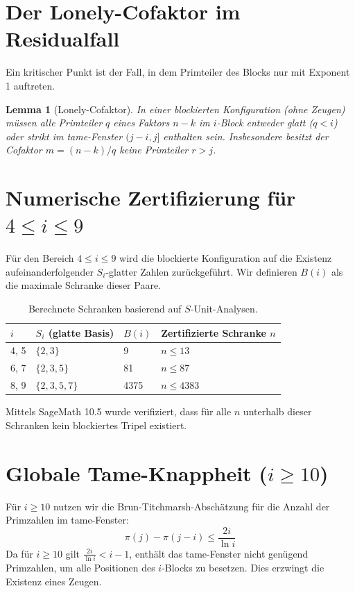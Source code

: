 \documentclass[12pt,a4paper]{article}
\newtheorem{lemma}[theorem]{Lemma}
\begin{document}
	\section{Der Lonely-Cofaktor im Residualfall}
	Ein kritischer Punkt ist der Fall, in dem Primteiler des Blocks nur mit Exponent 1 auftreten.
	
	\begin{lemma}[Lonely-Cofaktor]
		In einer blockierten Konfiguration (ohne Zeugen) müssen alle Primteiler $q$ eines Faktors $n-k$ im $i$-Block entweder glatt ($q < i$) oder strikt im tame-Fenster $(j-i, j]$ enthalten sein. Insbesondere besitzt der Cofaktor $m = (n-k)/q$ keine Primteiler $r > j$.
	\end{lemma}
	
	\section{Numerische Zertifizierung für $4 \le i \le 9$}
	Für den Bereich $4 \le i \le 9$ wird die blockierte Konfiguration auf die Existenz aufeinanderfolgender $S_i$-glatter Zahlen zurückgeführt. Wir definieren $B(i)$ als die maximale Schranke dieser Paare.
	
	\begin{table}[h]
		\centering
		\begin{tabular}{@{}llll@{}}
			\toprule
			$i$ & $S_i$ (glatte Basis) & $B(i)$ & Zertifizierte Schranke $n$ \\ \midrule
			4, 5 & $\{2, 3\}$ & 9 & $n \le 13$ \\
			6, 7 & $\{2, 3, 5\}$ & 81 & $n \le 87$ \\
			8, 9 & $\{2, 3, 5, 7\}$ & 4375 & $n \le 4383$ \\ \bottomrule
		\end{tabular}
		\caption{Berechnete Schranken basierend auf $S$-Unit-Analysen.}
	\end{table}
	
	Mittels SageMath 10.5 wurde verifiziert, dass für alle $n$ unterhalb dieser Schranken kein blockiertes Tripel existiert.
	
	\section{Globale Tame-Knappheit ($i \ge 10$)}
	Für $i \ge 10$ nutzen wir die Brun-Titchmarsh-Abschätzung für die Anzahl der Primzahlen im tame-Fenster:
	\begin{equation}
		\pi(j) - \pi(j-i) \le \frac{2i}{\ln i}
	\end{equation}
	Da für $i \ge 10$ gilt $\frac{2i}{\ln i} < i-1$, enthält das tame-Fenster nicht genügend Primzahlen, um alle Positionen des $i$-Blocks zu besetzen. Dies erzwingt die Existenz eines Zeugen.
	
\end{document}
